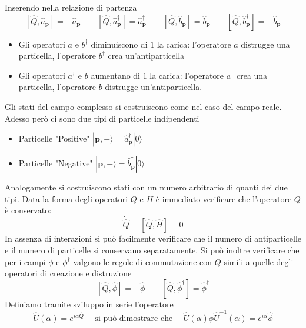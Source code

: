 Inserendo nella relazione di partenza
$$
[\hat{Q}, \hat{a}_\mathbf{p}] = -\hat{a}_\mathbf{p} \qquad [\hat{Q}, \hat{a}_\mathbf{p}^\dagger] = \hat{a}_\mathbf{p}^\dagger \qquad [\hat{Q}, \hat{b}_\mathbf{p}] = \hat{b}_\mathbf{p} \qquad [\hat{Q}, \hat{b}_\mathbf{p}^\dagger] = -\hat{b}_\mathbf{p}^\dagger
$$
\begin{itemize}
    \item Gli operatori $a$ e $b^\dagger$ diminuiscono di $1$ la carica: l'operatore $a$ distrugge una particella, l'operatore $b^\dagger$ crea un'antiparticella
    \item Gli operatori $a^\dagger$ e $b$ aumentano di $1$ la carica: l'operatore $a^\dagger$ crea una particella, l'operatore $b$ distrugge un'antiparticella.
\end{itemize}
Gli stati del campo complesso si costruiscono come nel caso del campo reale. Adesso però ci sono due tipi di particelle indipendenti
\begin{itemize}
    \item Particelle "Positive" $|\mathbf{p},+\rangle=\hat{a}_\mathbf{p}^\dagger|0\rangle$
    \item Particelle "Negative" $|\mathbf{p},-\rangle=\hat{b}_\mathbf{p}^\dagger|0\rangle$
\end{itemize}
Analogamente si costruiscono stati con un numero arbitrario di quanti dei due tipi. Data la forma degli operatori $Q$ e $H$ è immediato verificare che l'operatore $Q$ è conservato:
$$
\dot{\hat{Q}} = [\hat{Q}, \hat{H}] = 0
$$
In assenza di interazioni si può facilmente verificare che il numero di antiparticelle e il numero di particelle si conservano separatamente. Si può inoltre verificare che per i campi $\phi$ e $\phi^\dagger$ valgono le regole di commutazione con $Q$ simili a quelle degli operatori di creazione e distruzione
$$
[\hat{Q}, \hat{\phi}] = -\hat{\phi} \qquad [\hat{Q}, \hat{\phi}^\dagger] = \hat{\phi}^\dagger
$$
Definiamo tramite sviluppo in serie l'operatore 
$$
\hat{U}(\alpha) = e^{i\alpha\hat{Q}}\quad \text{ si può dimostrare che }\quad \hat{U}(\alpha)\hat{\phi}\hat{U}^{-1}(\alpha) = e^{i\alpha}\hat{\phi}
$$
